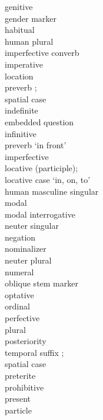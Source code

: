 \begin{multicols}{2}
\begin{tabbing}
				\>	genitive\\
				\> gender marker\\
				\>	habitual\\
				\>	human plural\\
				\>	imperfective converb\\
				\>	imperative\\
				\>	location \\
			{}		\>	    preverb ;\\
			{}		\>	    spatial case  \\
				\>	indefinite\\
				\>	embedded question\\
				\>	infinitive\\
				\>	preverb `in front'\\
				\>	imperfective\\
				\>	locative (participle);\\
			{}		\>	locative case `in, on, to'\\
					\>	human masculine singular\\
				\>	modal\\
				\>	modal interrogative\\
					\>	neuter singular\\
				\>	negation\\
				\>	nominalizer\\
				\>	neuter plural\\
				\>	numeral\\
				\>	oblique stem marker\\
				\>	optative\\
				\>	ordinal\\
				\>	perfective\\
				\>	plural\\
				\>	posteriority \\
			{}		\>	    temporal suffix ;\\
			{}		\>	    spatial case  \\
				\>	preterite\\
				\>	prohibitive\\
				\>	present\\
				\>	particle\\

\end{tabbing}
\end{multicols}
